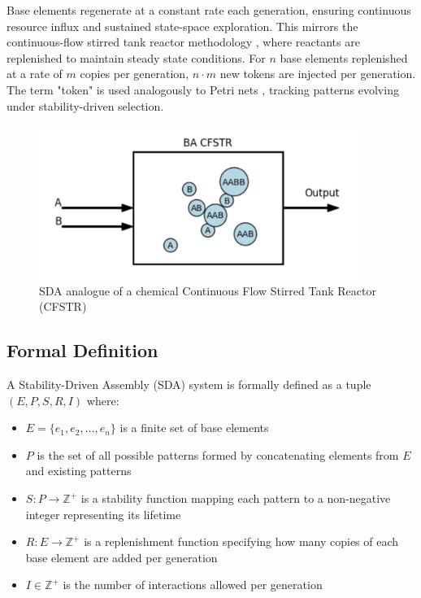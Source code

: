 \documentclass[preprint,12pt]{elsarticle}
\begin{document}
Base elements regenerate at a constant rate each generation, ensuring continuous resource influx and sustained state-space exploration. This mirrors the continuous-flow stirred tank reactor methodology \cite{fogler1999chemical}, where reactants are replenished to maintain steady state conditions. For \( n \) base elements replenished at a rate of \( m \) copies per generation, \( n \cdot m \) new tokens are injected per generation. The term "token" is used analogously to Petri nets \cite{petri1962communication}, tracking patterns evolving under stability-driven selection.

\begin{figure}[htp]
    \centering
    \includegraphics[height=5cm]{figure_1}
    \caption{SDA analogue of a chemical Continuous Flow Stirred Tank Reactor (CFSTR)}
    \label{fig:figure_1}
\end{figure}

\subsection{Formal Definition}

A Stability-Driven Assembly (SDA) system is formally defined as a tuple $(E, P, S, R, I)$ where:
\begin{itemize}
   \item $E = \{e_1, e_2, \ldots, e_n\}$ is a finite set of base elements
   \item $P$ is the set of all possible patterns formed by concatenating elements from $E$ and existing patterns
   \item $S: P \rightarrow \mathbb{Z}^{+}$ is a stability function mapping each pattern to a non-negative integer representing its lifetime
   \item $R: E \rightarrow \mathbb{Z}^{+}$ is a replenishment function specifying how many copies of each base element are added per generation
   \item $I \in \mathbb{Z}^{+}$ is the number of interactions allowed per generation
\end{itemize}
\end{document}
